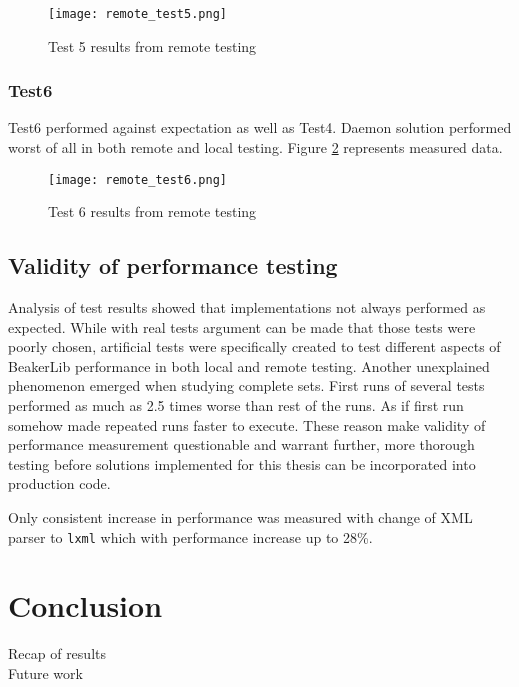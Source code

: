 \begin{figure}
  \texttt{[image: remote\_test5.png]}
  \caption{Test 5 results from remote testing}
  \label{fig:remote_test5}
\end{figure}


\subsection{Test6}
Test6 performed against expectation as well as Test4. Daemon solution performed worst of all in both remote and local testing. Figure \ref{fig:remote_test6} represents measured data.

\begin{figure}
  \texttt{[image: remote\_test6.png]}
  \caption{Test 6 results from remote testing}
  \label{fig:remote_test6}
\end{figure}

\section{Validity of performance testing}
Analysis of test results showed that implementations not always performed as expected. While with real tests argument can be made that those tests were poorly chosen, artificial tests were specifically created to test different aspects of BeakerLib performance in both local and remote testing. Another unexplained phenomenon emerged when studying complete sets. First runs of several tests performed as much as 2.5 times worse than rest of the runs. As if first run somehow made repeated runs faster to execute.
These reason make validity of performance measurement questionable and warrant further, more thorough testing before solutions implemented for this thesis can be  incorporated into production code.

Only consistent increase in performance was measured with change of XML parser to \texttt{lxml} which with performance increase up to 28\%.



\chapter{Conclusion}
\label{conclusion}
Recap of results
\\
Future work



